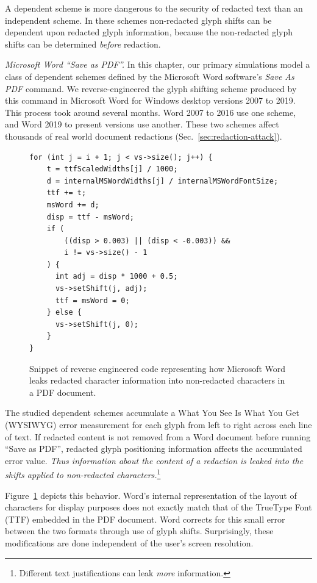A dependent scheme is more dangerous to the security of redacted text than an independent scheme.
In these schemes non-redacted glyph shifts can be dependent upon redacted glyph information, because the non-redacted glyph shifts can be determined \emph{before} redaction.

\emph{Microsoft Word ``Save as PDF''.}
In this chapter, our primary simulations model a class of dependent schemes defined by the Microsoft Word software's \emph{Save As PDF} command.
We reverse-engineered the glyph shifting scheme produced by this command in Microsoft Word for Windows desktop versions 2007 to 2019.
This process took around several months. 
Word 2007 to 2016 use one scheme, and Word 2019 to present versions use another.
These two schemes affect thousands of real world document redactions (Sec.~\ref{sec:redaction-attack}).

\begin{figure}
\begin{lstlisting}
for (int j = i + 1; j < vs->size(); j++) {
    t = ttfScaledWidths[j] / 1000;
    d = internalMSWordWidths[j] / internalMSWordFontSize;
    ttf += t;
    msWord += d;
    disp = ttf - msWord;
    if (
        ((disp > 0.003) || (disp < -0.003)) && 
        i != vs->size() - 1
    ) {
      int adj = disp * 1000 + 0.5;
      vs->setShift(j, adj);
      ttf = msWord = 0;
    } else {
      vs->setShift(j, 0);
    }
}
\end{lstlisting}
\caption{Snippet of reverse engineered code representing how Microsoft Word leaks redacted character information into non-redacted characters in a PDF document.
    }
\label{fig:msword-snippet}
\end{figure}


The studied dependent schemes accumulate a What You See Is What You Get (WYSIWYG) error measurement for each glyph from left to right across each line of text.
If redacted content is not removed from a Word document before running ``Save as PDF'', redacted glyph positioning information affects the accumulated error value.
\emph{Thus information about the content of a redaction is leaked into the shifts applied to non-redacted characters.}\footnote{Different text justifications can leak \emph{more} information.}

Figure~\ref{fig:msword-snippet} depicts this behavior.
Word's internal representation of the layout of characters for display purposes does not exactly match that of the TrueType Font (TTF) embedded in the PDF document.
Word corrects for this small error between the two formats through use of glyph shifts.
Surprisingly, these modifications are done independent of the user's screen resolution.

